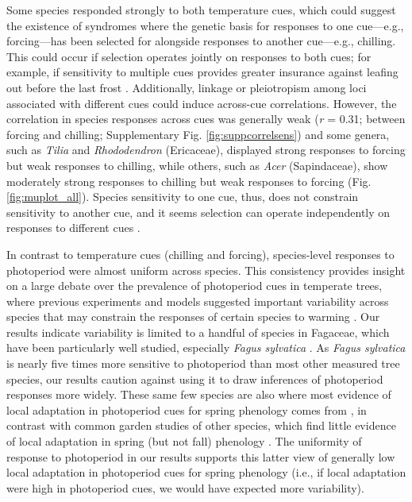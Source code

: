 \documentclass[11pt]{article}
\begin{document}
\par Some species responded strongly to both temperature cues, which could suggest the existence of syndromes where the genetic basis for responses to one cue---e.g.,  forcing---has been selected for alongside responses to another cue---e.g., chilling. This could occur if selection operates jointly on responses to both cues; for example, if sensitivity to multiple cues provides greater insurance against leafing out before the last frost \citep{bonamour2019,memegan2021}. Additionally, linkage or pleiotropism among loci associated with different cues \citep{nakagawa2005} could induce across-cue correlations. However, the correlation in species responses across cues was generally weak (\emph{r} = 0.31; between forcing and chilling; Supplementary Fig. \ref{fig:suppcorrelsens}) and some genera, such as \emph{Tilia} and \emph{Rhododendron} (Ericaceae), displayed strong responses to forcing but weak responses to chilling, while others, such as \emph{Acer} (Sapindaceae), show moderately strong responses to chilling but weak responses to forcing (Fig. \ref{fig:muplot_all}). Species sensitivity to one cue, thus, does not constrain sensitivity to another cue, and it seems selection can operate independently on responses to different cues \citep{bonamour2019}.

\par In contrast to temperature cues (chilling and forcing), species-level responses to photoperiod were almost uniform across species. This consistency provides insight on a large debate over the prevalence of photoperiod cues in temperate trees, where previous experiments \citep{Basler:2012,zohner2016} and models \citep[e.g.,][]{Hunter:1992jw,schaber20203} suggested important variability across species that may constrain the responses of certain species to warming \citep{way2015}. Our results indicate variability is limited to a handful of species in Fagaceae, which have been particularly well studied, especially \emph{Fagus sylvatica} \citep[e.g.,][]{Basler:2012,zohner2016,kramer2017}. As \emph{Fagus sylvatica} is nearly five times more sensitive to photoperiod than most other measured tree species, our results caution against using it to draw inferences of photoperiod responses more widely. These same few species are also where most evidence of local adaptation in photoperiod cues for spring phenology comes from \citep[e.g.,][]{kramer2017}, in contrast with common garden studies of other species, which find little evidence of local adaptation in spring (but not fall) phenology \citep{aitken2016}. The uniformity of response to photoperiod in our results supports this latter view of generally low local adaptation in photoperiod cues for spring phenology (i.e., if local adaptation were high in photoperiod cues, we would have expected more variability). 
\end{document}
